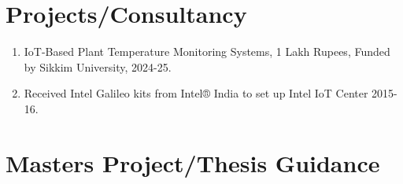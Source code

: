 \documentclass[11pt,a4paper]{moderncv}
\begin{document}
\section{\textbf{Projects/Consultancy}}

\begin{adjustwidth}{6em}{0pt}
	\begin{enumerate}
		
		\item IoT-Based Plant Temperature Monitoring Systems, 1 Lakh Rupees, Funded by Sikkim University, 2024-25.
		
		\item Received Intel Galileo kits from Intel® India to set up Intel IoT Center 2015-16.
		
	\end{enumerate}
\end{adjustwidth}



\section{\textbf{Masters Project/Thesis Guidance}}
\end{document}
